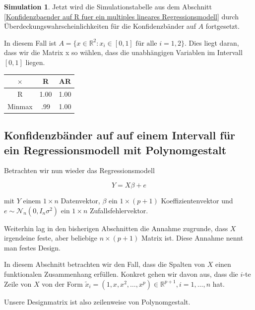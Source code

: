 \documentclass[12pt,a4paper]{article}
\theoremstyle{definition}
\theoremstyle{definition}
\theoremstyle{definition}
\newtheorem{Simulation}[Definition]{Simulation}
\theoremstyle{definition}
\newcommand{\UeberRR}{1.00}
\newcommand{\UeberRMinmax}{.99}
\newcommand{\UeberARR}{1.00}
\newcommand{\UeberARMinmax}{1.00}
\begin{document}
\begin{Simulation}
Jetzt wird die Simulationstabelle aus dem Abschnitt \ref{Konfidenzbaender auf R fuer ein multiples lineares Regressionsmodell} durch Überdeckungswahrscheinlichkeiten für die Konfidenzbänder auf $A$ fortgesetzt. 

In diesem Fall ist $A = \{x \in \mathbb{R}^2 : x_i \in [0,1] \text{ für alle } i=1, 2 \}$. Dies liegt daran, dass wir die Matrix x so wählen, dass die unabhängigen Variablen im Intervall $[0,1]$ liegen.

\begin{center}
\begin{tabular}{|c|c|c|}
\hline 
$\times$ & R & AR \\ 
\hline 
R 		& \UeberRR & \UeberARR \\ 
\hline 
Minmax 	& \UeberRMinmax & \UeberARMinmax \\ 
\hline 
\end{tabular}
\end{center}

\end{Simulation}



\subsection{Konfidenzbänder auf auf einem Intervall für ein Regressionsmodell mit Polynomgestalt}
\label{Konfidenzbaenderauf auf einem Intervall für Regressionsmodell mit Polynomgestalt}
Betrachten wir nun wieder das Regressionsmodell 

\begin{equation*}
Y=X\beta+e
\end{equation*}

mit $Y$ einem $1 \times n$ Datenvektor, $\beta$ ein $1 \times (p+1)$ Koeffizientenvektor und $e \sim \mathscr{N}_{n}(0,I_n \sigma^2)$ ein $1 \times n$ Zufallsfehlervektor.

Weiterhin lag in den bisherigen Abschnitten die Annahme zugrunde, dass $X$ irgendeine feste, aber beliebige $n \times (p+1)$ Matrix ist. Diese Annahme nennt man festes Design.

In diesem Abschnitt betrachten wir den Fall, dass die Spalten von $X$ einen funktionalen Zusammenhang erfüllen. Konkret gehen wir davon aus, dass die $i$-te Zeile von $X$ von der Form $\tilde{x}_i = (1, x, x^{2}, \ldots, x^{p}) \in \mathbb{R}^{p+1}, i = 1, \ldots, n$ hat. 

Unsere Designmatrix ist also zeilenweise von Polynomgestalt. 
\end{document}
